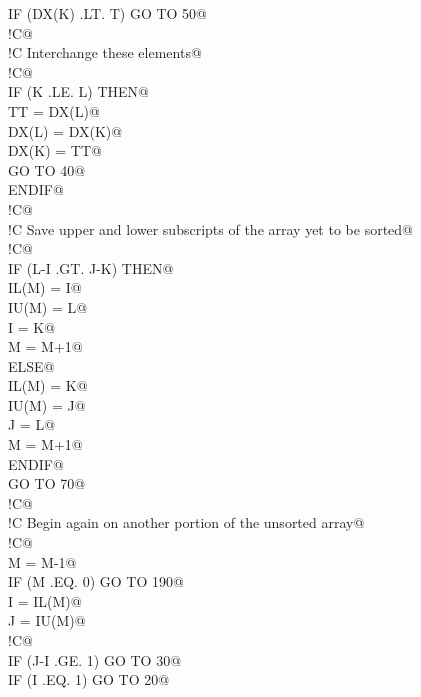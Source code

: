 \documentclass[10pt,a4paper,notitlepage]{article}
\begin{document}
\begin{flushleft}
\begin{list}{}{}
\mbox{}\verb@      IF (DX(K) .LT. T) GO TO 50@\\
\mbox{}\verb@!C@\\
\mbox{}\verb@!C     Interchange these elements@\\
\mbox{}\verb@!C@\\
\mbox{}\verb@      IF (K .LE. L) THEN@\\
\mbox{}\verb@         TT = DX(L)@\\
\mbox{}\verb@         DX(L) = DX(K)@\\
\mbox{}\verb@         DX(K) = TT@\\
\mbox{}\verb@         GO TO 40@\\
\mbox{}\verb@      ENDIF@\\
\mbox{}\verb@!C@\\
\mbox{}\verb@!C     Save upper and lower subscripts of the array yet to be sorted@\\
\mbox{}\verb@!C@\\
\mbox{}\verb@      IF (L-I .GT. J-K) THEN@\\
\mbox{}\verb@         IL(M) = I@\\
\mbox{}\verb@         IU(M) = L@\\
\mbox{}\verb@         I = K@\\
\mbox{}\verb@         M = M+1@\\
\mbox{}\verb@      ELSE@\\
\mbox{}\verb@         IL(M) = K@\\
\mbox{}\verb@         IU(M) = J@\\
\mbox{}\verb@         J = L@\\
\mbox{}\verb@         M = M+1@\\
\mbox{}\verb@      ENDIF@\\
\mbox{}\verb@      GO TO 70@\\
\mbox{}\verb@!C@\\
\mbox{}\verb@!C     Begin again on another portion of the unsorted array@\\
\mbox{}\verb@!C@\\
\mbox{} M = M-1@\\
\mbox{}\verb@      IF (M .EQ. 0) GO TO 190@\\
\mbox{}\verb@      I = IL(M)@\\
\mbox{}\verb@      J = IU(M)@\\
\mbox{}\verb@!C@\\
\mbox{} IF (J-I .GE. 1) GO TO 30@\\
\mbox{}\verb@      IF (I .EQ. 1) GO TO 20@\\

\end{list}
\end{flushleft}
\end{document}
